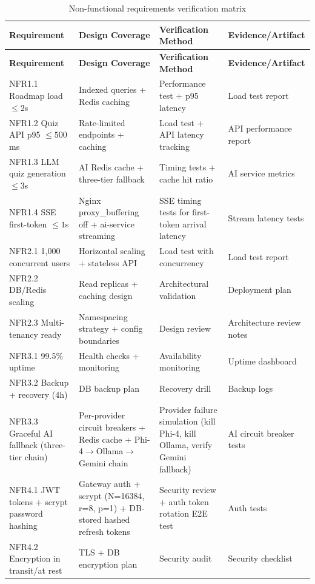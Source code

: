 \begin{longtable}{p{3cm}p{3.5cm}p{3cm}p{4.5cm}}
\caption{Non-functional requirements verification matrix}
\label{tab:ch04_nfr_verification}\\
\toprule
\textbf{Requirement} & \textbf{Design Coverage} & \textbf{Verification Method} & \textbf{Evidence/Artifact} \\
\midrule
\endfirsthead
\toprule
\textbf{Requirement} & \textbf{Design Coverage} & \textbf{Verification Method} & \textbf{Evidence/Artifact} \\
\midrule
\endhead
NFR1.1 Roadmap load $\le 2$s & Indexed queries + Redis caching & Performance test + p95 latency & Load test report \\
NFR1.2 Quiz API p95 $\le 500$ms & Rate-limited endpoints + caching & Load test + API latency tracking & API performance report \\
NFR1.3 LLM quiz generation $\le 3$s & AI Redis cache + three-tier fallback & Timing tests + cache hit ratio & AI service metrics \\
NFR1.4 SSE first-token $\le 1$s & Nginx proxy\_buffering off + ai-service streaming & SSE timing tests for first-token arrival latency & Stream latency tests \\
NFR2.1 1,000 concurrent users & Horizontal scaling + stateless API & Load test with concurrency & Load test report \\
NFR2.2 DB/Redis scaling & Read replicas + caching design & Architectural validation & Deployment plan \\
NFR2.3 Multi-tenancy ready & Namespacing strategy + config boundaries & Design review & Architecture review notes \\
NFR3.1 99.5\% uptime & Health checks + monitoring & Availability monitoring & Uptime dashboard \\
NFR3.2 Backup + recovery (4h) & DB backup plan & Recovery drill & Backup logs \\
NFR3.3 Graceful AI fallback (three-tier chain) & Per-provider circuit breakers + Redis cache + Phi-4$\to$Ollama$\to$Gemini chain & Provider failure simulation (kill Phi-4, kill Ollama, verify Gemini fallback) & AI circuit breaker tests \\
NFR4.1 JWT tokens + scrypt password hashing & Gateway auth + scrypt (N=16384, r=8, p=1) + DB-stored hashed refresh tokens & Security review + auth token rotation E2E test & Auth tests \\
NFR4.2 Encryption in transit/at rest & TLS + DB encryption plan & Security audit & Security checklist \\

\end{longtable}
